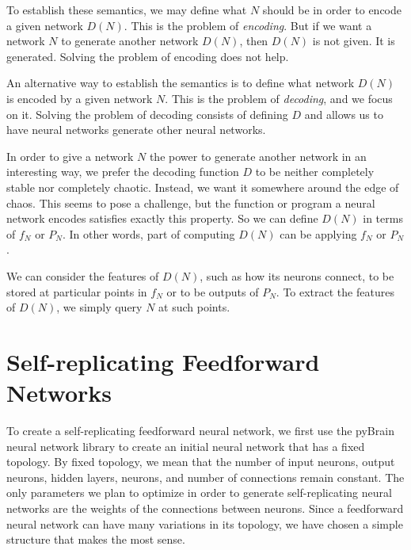 \documentclass[12pt]{article}
\newcommand{\term}[1]{\emph{#1}}
\begin{document}
To establish these semantics,
we may define what $N$ should be
in order to encode a given network $D(N)$.
This is the problem of \term{encoding}.
But if we want a network $N$
to generate another network $D(N)$,
then $D(N)$ is not given.
It is generated.
Solving the problem of encoding does not help.

An alternative way to establish the semantics
is to define what network $D(N)$ is encoded
by a given network $N$.
This is the problem of \term{decoding},
and we focus on it.
Solving the problem of decoding
consists of defining $D$
and allows us to have neural networks
generate other neural networks.

In order to give a network $N$
the power to generate another network
in an interesting way,
we prefer the decoding function $D$
to be neither completely stable
nor completely chaotic.
Instead, we want it somewhere around the edge of chaos.%
\cite{langton1990edgechaos}%
\cite{bertschinger2004edgechaos}
This seems to pose a challenge,
but the function or program a neural network encodes
satisfies exactly this property.
So we can define $D(N)$ in terms of $f_N$ or $P_N$.
In other words, part of computing $D(N)$
can be applying $f_N$ or $P_N$.

We can consider the features of $D(N)$,
such as how its neurons connect,
to be stored at particular points
in $f_N$
or to be outputs of $P_N$.
To extract the features of $D(N)$,
we simply query $N$ at such points.



\section{Self-replicating Feedforward Networks}
\label{feedforward}

To create a self-replicating feedforward neural network,
we first use the pyBrain neural network library \cite{schaul2010}
to create an initial neural network that has a fixed topology.
By fixed topology, we mean that
the number of input neurons,
output neurons,
hidden layers,
neurons, and number of connections remain constant.
The only parameters we plan to optimize
in order to generate self-replicating neural networks
are the weights of the connections between neurons.
Since a feedforward neural network
can have many variations in its topology,
we have chosen a simple structure that makes the most sense.
\end{document}
